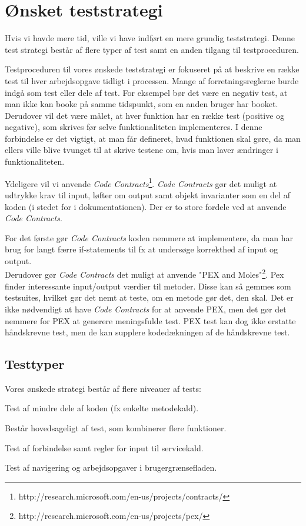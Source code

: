\section{Ønsket teststrategi}
\label{Test_intendedStrat}
Hvis vi havde mere tid, ville vi have indført en mere grundig teststrategi. Denne test strategi består af flere typer af test samt en anden tilgang til testproceduren.

Testproceduren til vores ønskede teststrategi er fokuseret på at beskrive en række test til hver arbejdsopgave tidligt i processen. Mange af forretningsreglerne burde indgå som test eller dele af test. For eksempel bør det være en negativ test, at man ikke kan booke på samme tidspunkt, som en anden bruger har booket.
\\Derudover vil det være målet, at hver funktion har en række test (positive og negative), som skrives før selve funktionaliteten implementeres. I denne forbindelse er det vigtigt, at man får defineret, hvad funktionen skal gøre, da man ellers ville blive tvunget til at skrive testene om, hvis man laver ændringer i funktionaliteten.

Ydeligere vil vi anvende \textit{Code Contracts}\footnote{http://research.microsoft.com/en-us/projects/contracts/}. \textit{Code Contracts} gør det muligt at udtrykke krav til input, løfter om output samt objekt invarianter som en del af koden (i stedet for i dokumentationen). Der er to store fordele ved at anvende \textit{Code Contracts}. 

For det første gør \textit{Code Contracts} koden nemmere at implementere, da man har brug for langt færre if-statements til fx at undersøge korrekthed af input og output.
\\Derudover gør \textit{Code Contracts} det muligt at anvende "PEX and Moles"\footnote{http://research.microsoft.com/en-us/projects/pex/}. Pex finder interessante input/output værdier til metoder. Disse kan så gemmes som testsuites, hvilket gør det nemt at teste, om en metode gør det, den skal. Det er ikke nødvendigt at have \textit{Code Contracts} for at anvende PEX, men det gør det nemmere for PEX at generere meningsfulde test. PEX test kan dog ikke erstatte håndskrevne test, men de kan supplere kodedækningen af de håndskrevne test.

\subsection{Testtyper}
\label{Test_intendedStrat_types}
Vores ønskede strategi består af flere niveauer af tests:
\begin{my_description}
\item[Unit] Test af mindre dele af koden (fx enkelte metodekald).
\item[Scenario] Består hovedsageligt af test, som kombinerer flere funktioner.
\item[Service] Test af forbindelse samt regler for input til servicekald.
\item[Brugergrænseflade] Test af navigering og arbejdsopgaver i brugergrænsefladen.
\end{my_description}

